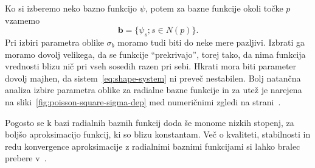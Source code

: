 \documentclass[12pt,a4paper,twoside]{article}
\theoremstyle{definition} %
\theoremstyle{plain} %
\numberwithin{equation}{section}
\renewcommand{\b}{\boldsymbol}
\begin{document}
Ko si izberemo neko bazno funkcijo $\psi$, potem za bazne funkcije okoli točke
$p$ vzamemo
\[
  \b b = \{\psi_s; s \in N(p) \}.
\]
Pri izbiri parametra oblike $\sigma_b$ moramo tudi biti do neke mere pazljivi. Izbrati
ga moramo dovolj velikega, da se funkcije ``prekrivajo'', torej tako, da nima
funkcija vrednosti blizu nič pri vseh sosedih razen pri sebi. Hkrati mora biti
parameter dovolj majhen, da sistem~\eqref{eq:shape-system} ni preveč nestabilen.
Bolj natančna analiza izbire parametra oblike za radialne bazne funkcije in
za utež je narejena na sliki~\ref{fig:poisson-square-sigma-dep} med numeričnimi
zgledi na strani~\pageref{fig:poisson-square-sigma-dep}.

Pogosto se k bazi radialnih baznih funkcij doda še monome nizkih stopenj, za
boljšo aproksimacijo funkcij, ki so blizu konstantam. Več o kvaliteti,
stabilnosti in redu konvergence aproksimacije z radialnimi baznimi funkcijami
si lahko bralec prebere v~\cite{buhmann2000radial}.
\end{document}
